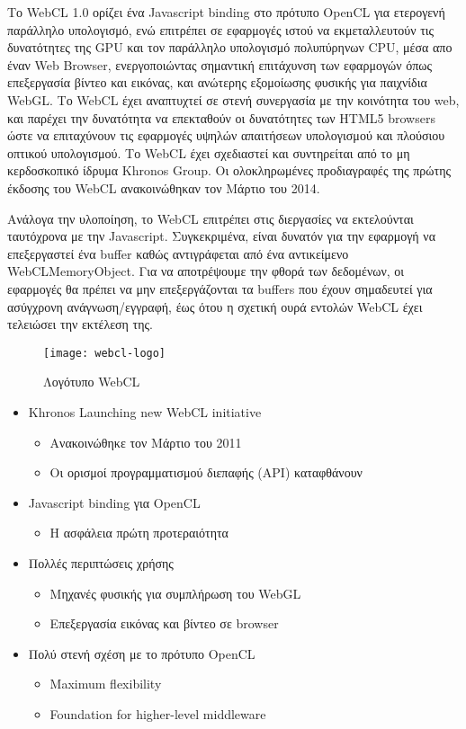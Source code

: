 Το WebCL 1.0 ορίζει ένα Javascript binding στο πρότυπο OpenCL για ετερογενή παράλληλο υπολογισμό, ενώ επιτρέπει σε εφαρμογές ιστού να εκμεταλλευτούν τις δυνατότητες της GPU και τον παράλληλο υπολογισμό πολυπύρηνων CPU, μέσα απο έναν Web Browser, ενεργοποιώντας σημαντική επιτάχυνση των εφαρμογών όπως επεξεργασία βίντεο και εικόνας, και ανώτερης εξομοίωσης φυσικής για παιχνίδια WebGL. Το WebCL έχει αναπτυχτεί σε στενή συνεργασία με την κοινότητα του web, και παρέχει την δυνατότητα να επεκταθούν οι δυνατότητες των HTML5 browsers ώστε να επιταχύνουν τις εφαρμογές υψηλών απαιτήσεων υπολογισμού και πλούσιου οπτικού υπολογισμού. Το WebCL έχει σχεδιαστεί και συντηρείται από το μη κερδοσκοπικό ίδρυμα Khronos Group. Οι ολοκληρωμένες προδιαγραφές της πρώτης έκδοσης του WebCL ανακοινώθηκαν τον Μάρτιο του 2014.\cite{opencl-5} 

Ανάλογα την υλοποίηση, το WebCL επιτρέπει στις διεργασίες να εκτελούνται ταυτόχρονα με την Javascript. Συγκεκριμένα, είναι δυνατόν για την εφαρμογή να επεξεργαστεί ένα buffer καθώς αντιγράφεται από ένα αντικείμενο WebCLMemoryObject. Για να αποτρέψουμε την φθορά των δεδομένων, οι εφαρμογές θα πρέπει να μην επεξεργάζονται τα buffers που έχουν σημαδευτεί για ασύγχρονη ανάγνωση/εγγραφή, έως ότου η σχετική ουρά εντολών WebCL έχει τελειώσει την εκτέλεση της.

\begin{figure}[h]
	\texttt{[image: webcl-logo]}
	\centering
	\caption{Λογότυπο WebCL}
\end{figure}
\begin{itemize}
\item Khronos Launching new WebCL initiative
	\begin{itemize}
	\item Ανακοινώθηκε τον Μάρτιο του 2011
	\item Οι ορισμοί προγραμματισμού διεπαφής (API) καταφθάνουν
	\end{itemize}
\item Javascript binding για OpenCL
	\begin{itemize}
	\item Η ασφάλεια πρώτη προτεραιότητα
	\end{itemize}
\item Πολλές περιπτώσεις χρήσης
	\begin{itemize}
	\item Μηχανές φυσικής για συμπλήρωση του WebGL
	\item Επεξεργασία εικόνας και βίντεο σε browser
	\end{itemize}
\item Πολύ στενή σχέση με το πρότυπο OpenCL
	\begin{itemize}
	\item Maximum flexibility
	\item Foundation for higher-level middleware
	\end{itemize}
\end{itemize}


